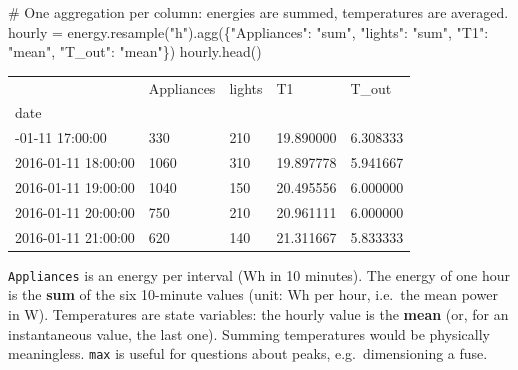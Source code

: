 \documentclass[
  letterpaper,
  DIV=11,
  numbers=noendperiod]{scrreprt}
\newenvironment{Shaded}{\begin{snugshade}}{\end{snugshade}}
\newcommand{\CommentTok}[1]{\textcolor[rgb]{0.37,0.37,0.37}{#1}}
\newcommand{\NormalTok}[1]{\textcolor[rgb]{0.00,0.23,0.31}{#1}}
\newcommand{\OperatorTok}[1]{\textcolor[rgb]{0.37,0.37,0.37}{#1}}
\newcommand{\StringTok}[1]{\textcolor[rgb]{0.13,0.47,0.30}{#1}}
\begin{document}
\begin{tcolorbox}[enhanced jigsaw, left=2mm, title=\textcolor{quarto-callout-caution-color}{\faFire}\hspace{0.5em}{Solution to Exercise 2}, opacityback=0, breakable, rightrule=.15mm, arc=.35mm, toptitle=1mm, colbacktitle=quarto-callout-caution-color!10!white, opacitybacktitle=0.6, coltitle=black, colframe=quarto-callout-caution-color-frame, bottomrule=.15mm, leftrule=.75mm, bottomtitle=1mm, titlerule=0mm, toprule=.15mm, colback=white]

\begin{Shaded}
\begin{Highlighting}[]
\CommentTok{\# One aggregation per column: energies are summed, temperatures are averaged.}
\NormalTok{hourly }\OperatorTok{=}\NormalTok{ energy.resample(}\StringTok{"h"}\NormalTok{).agg(\{}\StringTok{"Appliances"}\NormalTok{: }\StringTok{"sum"}\NormalTok{, }\StringTok{"lights"}\NormalTok{: }\StringTok{"sum"}\NormalTok{,}
                                   \StringTok{"T1"}\NormalTok{: }\StringTok{"mean"}\NormalTok{, }\StringTok{"T\_out"}\NormalTok{: }\StringTok{"mean"}\NormalTok{\})}
\NormalTok{hourly.head()}
\end{Highlighting}
\end{Shaded}

\begin{longtable}[]{@{}lllll@{}}
\toprule\noalign{}
& Appliances & lights & T1 & T\_out \\
date & & & & \\
\midrule\noalign{}
\endhead
\bottomrule\noalign{}
\endlastfoot
2016-01-11 17:00:00 & 330 & 210 & 19.890000 & 6.308333 \\
2016-01-11 18:00:00 & 1060 & 310 & 19.897778 & 5.941667 \\
2016-01-11 19:00:00 & 1040 & 150 & 20.495556 & 6.000000 \\
2016-01-11 20:00:00 & 750 & 210 & 20.961111 & 6.000000 \\
2016-01-11 21:00:00 & 620 & 140 & 21.311667 & 5.833333 \\
\end{longtable}

\texttt{Appliances} is an energy per interval (Wh in 10 minutes). The
energy of one hour is the \textbf{sum} of the six 10-minute values
(unit: Wh per hour, i.e.~the mean power in W). Temperatures are state
variables: the hourly value is the \textbf{mean} (or, for an
instantaneous value, the last one). Summing temperatures would be
physically meaningless. \texttt{max} is useful for questions about
peaks, e.g.~dimensioning a fuse.

\end{tcolorbox}
\end{document}
